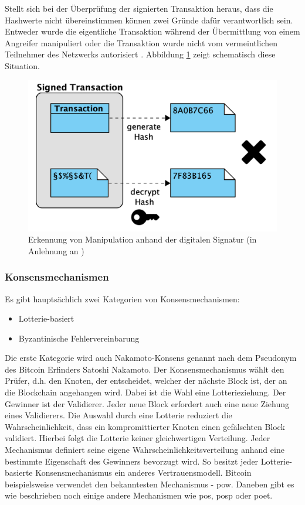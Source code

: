 Stellt sich bei der Überprüfung der signierten Transaktion heraus, dass die Hashwerte nicht übereinstimmen können zwei Gründe dafür verantwortlich sein. Entweder wurde die eigentliche Transaktion während der Übermittlung von einem Angreifer manipuliert oder die Transaktion wurde nicht vom vermeintlichen Teilnehmer des Netzwerks autorisiert \citep{Drescher2017}. Abbildung \ref{fig:digital-signatures-validate-negative} zeigt schematisch diese Situation.

\begin{figure}[H]
	\centering
	\includegraphics[width=0.8\linewidth]{pictures/digital-signatures-validate-negative}
	\caption[Manipulationerkennung durch digitale Signaturen]{Erkennung von Manipulation anhand der digitalen Signatur (in Anlehnung an \citet{Drescher2017})}
	\label{fig:digital-signatures-validate-negative}
\end{figure}

\subsubsection{Konsensmechanismen}
Es gibt hauptsächlich zwei Kategorien von Konsensmechanismen:

\begin{itemize}
	\item Lotterie-basiert
	\item Byzantinische Fehlervereinbarung
\end{itemize}

Die erste Kategorie wird auch Nakamoto-Konsens genannt nach dem Pseudonym des Bitcoin Erfinders Satoshi Nakamoto. Der Konsensmechanismus wählt den Prüfer, d.h. den Knoten, der entscheidet, welcher der nächste Block ist, der an die Blockchain angehangen wird. Dabei ist die Wahl eine Lotterieziehung. Der Gewinner ist der Validierer. Jeder neue Block erfordert auch eine neue Ziehung eines Validierers. Die Auswahl durch eine Lotterie reduziert die Wahrscheinlichkeit, dass ein kompromittierter Knoten einen gefälschten Block validiert. Hierbei folgt die Lotterie keiner gleichwertigen Verteilung. Jeder Mechanismus definiert seine eigene Wahrscheinlichkeitsverteilung anhand eine bestimmte Eigenschaft des Gewinners bevorzugt wird. So besitzt jeder Lotterie-basierte Konsensmechanismus ein anderes Vertrauensmodell. Bitcoin beispielsweise verwendet den bekanntesten Mechanismus - \acf{pow}. Daneben gibt es wie beschrieben noch einige andere Mechanismen wie \acf{pos}, \acf{posp} oder \acf{poet}.

